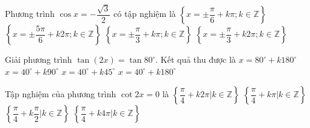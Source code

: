 \begin{ex}%
	Phương trình $\cos x=-\dfrac{\sqrt{3}}{2}$ có tập nghiệm là
	\choice
	{$\left\{ x=\pm \dfrac{\pi }{6}+k\pi ; k\in \mathbb{Z} \right\}$}
	{\True $\left\{ x=\pm \dfrac{5\pi }{6}+k2\pi ; k\in \mathbb{Z} \right\}$}
	{$\left\{ x=\pm \dfrac{\pi }{3}+k\pi ; k\in \mathbb{Z} \right\}$}
	{$\left\{ x=\pm \dfrac{\pi }{3}+k2\pi ; k\in \mathbb{Z} \right\}$}
\end{ex}

\begin{ex}%
	Giải phương trình $\tan (2x)=\tan 80^\circ $. Kết quả thu được là
	\choice
	{$x=80^\circ +k180^\circ $}
	{\True $x=40^\circ +k90^\circ $}
	{$x=40^\circ +k45^\circ $}
	{$x=40^\circ +k180^\circ $}
\end{ex}

\begin{ex}%
	Tập nghiệm của phương trình $\cot 2x=0$ là
	\choice
	{$\left\{ \dfrac{\pi }{4}+k2\pi |k\in \mathbb{Z} \right\}$}
	{$\left\{ \dfrac{\pi }{4}+k\pi |k\in \mathbb{Z} \right\}$}
	{\True $\left\{ \dfrac{\pi }{4}+k\dfrac{\pi }{2}|k\in \mathbb{Z} \right\}$}
	{$\left\{ \dfrac{\pi }{4}+k4\pi |k\in \mathbb{Z} \right\}$}
\end{ex}

